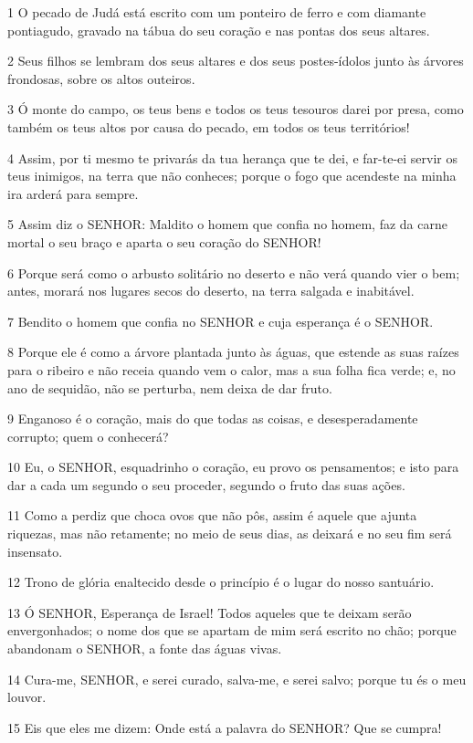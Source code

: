 \par 1 O pecado de Judá está escrito com um ponteiro de ferro e com diamante pontiagudo, gravado na tábua do seu coração e nas pontas dos seus altares.
\par 2 Seus filhos se lembram dos seus altares e dos seus postes-ídolos junto às árvores frondosas, sobre os altos outeiros.
\par 3 Ó monte do campo, os teus bens e todos os teus tesouros darei por presa, como também os teus altos por causa do pecado, em todos os teus territórios!
\par 4 Assim, por ti mesmo te privarás da tua herança que te dei, e far-te-ei servir os teus inimigos, na terra que não conheces; porque o fogo que acendeste na minha ira arderá para sempre.
\par 5 Assim diz o SENHOR: Maldito o homem que confia no homem, faz da carne mortal o seu braço e aparta o seu coração do SENHOR!
\par 6 Porque será como o arbusto solitário no deserto e não verá quando vier o bem; antes, morará nos lugares secos do deserto, na terra salgada e inabitável.
\par 7 Bendito o homem que confia no SENHOR e cuja esperança é o SENHOR.
\par 8 Porque ele é como a árvore plantada junto às águas, que estende as suas raízes para o ribeiro e não receia quando vem o calor, mas a sua folha fica verde; e, no ano de sequidão, não se perturba, nem deixa de dar fruto.
\par 9 Enganoso é o coração, mais do que todas as coisas, e desesperadamente corrupto; quem o conhecerá?
\par 10 Eu, o SENHOR, esquadrinho o coração, eu provo os pensamentos; e isto para dar a cada um segundo o seu proceder, segundo o fruto das suas ações.
\par 11 Como a perdiz que choca ovos que não pôs, assim é aquele que ajunta riquezas, mas não retamente; no meio de seus dias, as deixará e no seu fim será insensato.
\par 12 Trono de glória enaltecido desde o princípio é o lugar do nosso santuário.
\par 13 Ó SENHOR, Esperança de Israel! Todos aqueles que te deixam serão envergonhados; o nome dos que se apartam de mim será escrito no chão; porque abandonam o SENHOR, a fonte das águas vivas.
\par 14 Cura-me, SENHOR, e serei curado, salva-me, e serei salvo; porque tu és o meu louvor.
\par 15 Eis que eles me dizem: Onde está a palavra do SENHOR? Que se cumpra!
